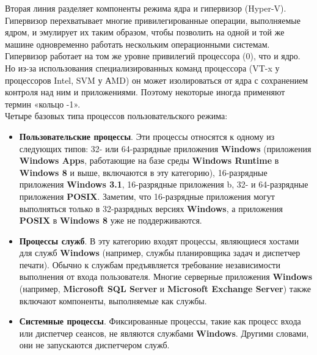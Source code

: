 \documentclass[14pt, a4paper]{article}
\begin{document}
Вторая линия разделяет компоненты режима ядра и гипервизор (Hyper-V). Гипервизор перехватывает
многие привилегированные операции, выполняемые ядром, и эмулирует их таким образом,
чтобы позволить на одной и той же машине одновременно работать нескольким операционными системам.
Гипервизор работает на том же уровне привилегий процессора (0), что и ядро. Но из-за
использования специализированных команд процессора (VT-x у процессоров Intel, SVM у АMD)
он может изолироваться от ядра с сохранением контроля над ним и приложениями.
Поэтому некоторые иногда применяют термин «кольцо -1». \\


Четыре базовых типа процессов пользовательского режима:
\begin{itemize}
    \item \textbf{Пользовательские процессы}. Эти процессы относятся к одному из следующих типов:
    32- или 64-разрядные приложения \textbf{Windows} (приложения \textbf{Windows Apps}, работающие на базе
    среды \textbf{Windows Runtime} в \textbf{Windows 8} и выше, включаются в эту категорию), 16-разрядные приложения \textbf{Windows 3.1},
    16-разрядные приложения b, 32- и 64-разрядные приложения \textbf{POSIX}. Заметим,
    что 16-разрядные приложения могут выполняться только в 32-разрядных версиях \linebreak[4]\textbf{Windows},
    а приложения \textbf{POSIX} в \textbf{Windows 8} уже не поддерживаются.

    \item \textbf{Процессы служб}. В эту категорию входят процессы, являющиеся хостами для
    служб \textbf{Windows} (например, службы планировщика задач и диспетчер печати).
    Обычно к службам предъявляется требование независимости выполнения от входа пользователя.
    Многие серверные приложения \textbf{Windows} (например, \textbf{Microsoft SQL Server} и \textbf{Microsoft Exchange Server})
    также включают компоненты, выполняемые как службы.

    \item \textbf{Системные процессы}. Фиксированные процессы, такие как процесс входа
    или диспетчер сеансов, не являются службами \textbf{Windows}. Другими словами,
    они не запускаются диспетчером служб.


\end{itemize}
\end{document}
